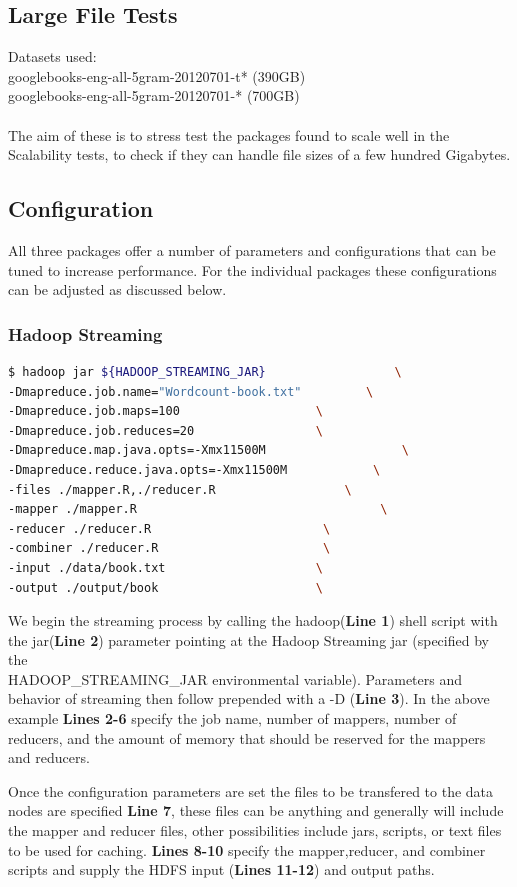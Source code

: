 \documentclass[
journal=jacsat, %
manuscript=article]{achemso}
\begin{document}
\subsection{Large File Tests}
Datasets used: \\
    googlebooks-eng-all-5gram-20120701-t*  (390GB)\\
    googlebooks-eng-all-5gram-20120701-*   (700GB)\\ \\
The aim of these is to stress test the packages found to scale well in the Scalability tests, to check if they can handle file sizes of a few hundred Gigabytes.   
    

\subsection{Configuration}    
All three packages offer a number of parameters and configurations that can be tuned to increase performance. For the individual packages these configurations can be adjusted as discussed below.  

\subsubsection{Hadoop Streaming}
\begin{lstlisting}[language=bash, caption=Hadoop streaming]
$ hadoop jar ${HADOOP_STREAMING_JAR}		          \
-Dmapreduce.job.name="Wordcount-book.txt" 		  \
-Dmapreduce.job.maps=100 				   \
-Dmapreduce.job.reduces=20 				   \
-Dmapreduce.map.java.opts=-Xmx11500M 	           	   \
-Dmapreduce.reduce.java.opts=-Xmx11500M 		   \
-files ./mapper.R,./reducer.R  				   \
-mapper ./mapper.R                      		    \
-reducer ./reducer.R		  			    \
-combiner ./reducer.R					    \
-input ./data/book.txt	  				   \
-output ./output/book	  				   \
\end{lstlisting}

We begin the streaming process by calling the hadoop(\textbf{Line 1}) shell script with the jar(\textbf{Line 2}) parameter pointing at the Hadoop Streaming jar (specified by the \\ HADOOP\_STREAMING\_JAR environmental variable). Parameters and behavior of streaming then follow prepended with a -D (\textbf{Line 3}). In the above example \textbf{Lines 2-6} specify the job name, number of mappers, number of reducers, and the amount of memory that should be reserved for the mappers and reducers. 

Once the configuration parameters are set the files to be transfered to the data nodes are specified \textbf{Line 7}, these files can be anything and generally will include the mapper and reducer files, other possibilities include jars, scripts, or text files to be used for caching. \textbf{Lines 8-10} specify the mapper,reducer, and combiner scripts and supply the HDFS input (\textbf{Lines 11-12}) and output paths.
\end{document}

